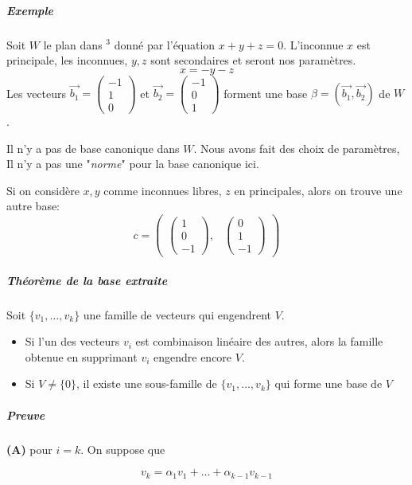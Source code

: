 \subparagraph{Exemple}
Soit $W$ le plan dans \R$^3$ donné par l'équation $x + y + z = 0$. L'inconnue $x$ est principale, les inconnues, $y, z$ sont secondaires et seront nos paramètres.
\[x = -y -z\]
Les vecteurs $\vec{b_1} = \begin{pmatrix}
    -1 \\ 1 \\ 0
\end{pmatrix}$ et $\vec{b_2} =  \begin{pmatrix}
    -1 \\ 0  \\1
\end{pmatrix}$ forment une base $\beta = (\vec{b_1}, \vec{b_2})$ de $W$.
\begin{framedremark}
    Il n'y a pas de base canonique dans $W$. Nous avons fait des choix de paramètres, Il n'y a pas une "\textit{norme}" pour la base canonique ici.
\end{framedremark}
\begin{exemple}
    Si on considère $x, y$ comme inconnues libres, $z$ en principales, alors on trouve une autre base:
    \[c = \begin{pmatrix}
        
    \begin{pmatrix}
        1 \\ 0 \\ -1
    \end{pmatrix}, & \begin{pmatrix}
        0 \\ 1 \\ -1
    \end{pmatrix}\end{pmatrix}\]
\end{exemple}
\subparagraph{Théorème de la base extraite}
Soit $\{v_1, \dots, v_k\}$ une famille de vecteurs qui engendrent $V$.
\begin{theoreme}
    \begin{itemize}
        \item Si l'un des vecteurs $v_i$ est combinaison linéaire des autres, alors la famille obtenue en supprimant $v_i$ engendre encore $V$.
        \item Si $V \neq \{0\}$, il existe une sous-famille de $\{v_1, \dots, v_k\}$ qui forme une base de $V$
    \end{itemize}
\end{theoreme}
\subparagraph{Preuve} \textbf{(A)} pour $i = k$. On suppose que
\begin{formule}
    \[v_k = \alpha_1v_1 + \dots + \alpha_{k-1}v_{k-1}\]
\end{formule}
